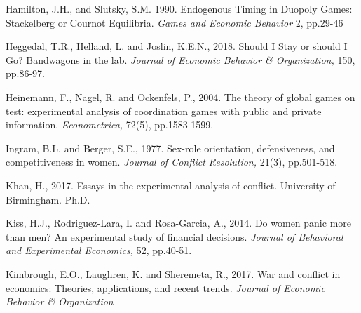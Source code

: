 \documentclass[12pt, letterpaper]{article}
\theoremstyle{plain}
\begin{document}
\begin{thebibliography}{10}

\bibitem{} Hamilton, J.H., and Slutsky, S.M. 1990. Endogenous Timing in Duopoly Games: Stackelberg or Cournot Equilibria. \textit{Games and Economic Behavior} 2, pp.29-46

\bibitem{} Heggedal, T.R., Helland, L. and Joslin, K.E.N., 2018. Should I Stay or should I Go? Bandwagons in the lab. \textit{Journal of Economic Behavior \& Organization,} 150, pp.86-97.

\bibitem{}Heinemann, F., Nagel, R. and Ockenfels, P., 2004. The theory of global games on test: experimental analysis of coordination games with public and private information. \textit{Econometrica, } 72(5), pp.1583-1599.




\bibitem{} Ingram, B.L. and Berger, S.E., 1977. Sex-role orientation, defensiveness, and competitiveness in women. \textit{Journal of Conflict Resolution,} 21(3), pp.501-518.


\bibitem{} Khan, H., 2017. Essays in the experimental analysis of conflict. University of Birmingham. Ph.D.

\bibitem{} Kiss, H.J., Rodriguez-Lara, I. and Rosa-Garcia, A., 2014. Do women panic more than men? An experimental study of financial decisions. \textit{Journal of Behavioral and Experimental Economics,} 52, pp.40-51.


\bibitem{} Kimbrough, E.O., Laughren, K. and Sheremeta, R., 2017. War and conflict in economics: Theories, applications, and recent trends. \textit{Journal of Economic Behavior \& Organization}


\end{thebibliography}
\end{document}
